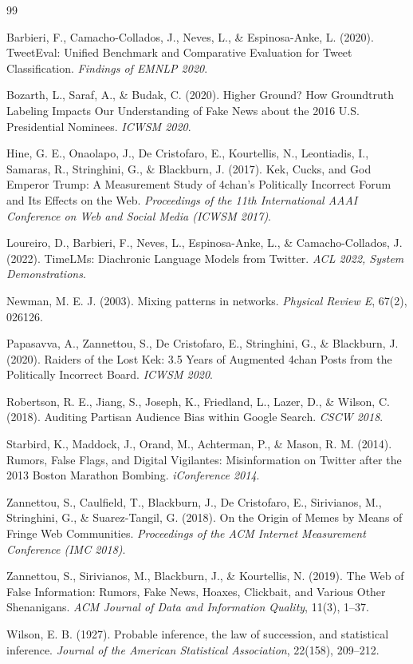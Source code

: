 \documentclass[11pt]{article}
\begin{document}
\begin{thebibliography}{99}

Barbieri, F., Camacho-Collados, J., Neves, L., \& Espinosa-Anke, L. (2020).
TweetEval: Unified Benchmark and Comparative Evaluation for Tweet
Classification. \emph{Findings of EMNLP 2020}.

Bozarth, L., Saraf, A., \& Budak, C. (2020). Higher Ground? How Groundtruth
Labeling Impacts Our Understanding of Fake News about the 2016 U.S.
Presidential Nominees. \emph{ICWSM 2020}.

Hine, G. E., Onaolapo, J., De Cristofaro, E., Kourtellis, N., Leontiadis, I.,
Samaras, R., Stringhini, G., \& Blackburn, J. (2017). Kek, Cucks, and God
Emperor Trump: A Measurement Study of 4chan's Politically Incorrect Forum and
Its Effects on the Web. \emph{Proceedings of the 11th International AAAI
Conference on Web and Social Media (ICWSM 2017)}.

Loureiro, D., Barbieri, F., Neves, L., Espinosa-Anke, L., \& Camacho-Collados,
J. (2022). TimeLMs: Diachronic Language Models from Twitter. \emph{ACL 2022,
System Demonstrations}.

Newman, M. E. J. (2003). Mixing patterns in networks. \emph{Physical Review E},
67(2), 026126.

Papasavva, A., Zannettou, S., De Cristofaro, E., Stringhini, G., \& Blackburn,
J. (2020). Raiders of the Lost Kek: 3.5 Years of Augmented 4chan Posts from the
Politically Incorrect Board. \emph{ICWSM 2020}.

Robertson, R. E., Jiang, S., Joseph, K., Friedland, L., Lazer, D., \& Wilson, C.
(2018). Auditing Partisan Audience Bias within Google Search. \emph{CSCW 2018}.

Starbird, K., Maddock, J., Orand, M., Achterman, P., \& Mason, R. M. (2014).
Rumors, False Flags, and Digital Vigilantes: Misinformation on Twitter after the
2013 Boston Marathon Bombing. \emph{iConference 2014}.

Zannettou, S., Caulfield, T., Blackburn, J., De Cristofaro, E., Sirivianos, M.,
Stringhini, G., \& Suarez-Tangil, G. (2018). On the Origin of Memes by Means of
Fringe Web Communities. \emph{Proceedings of the ACM Internet Measurement
Conference (IMC 2018)}.

Zannettou, S., Sirivianos, M., Blackburn, J., \& Kourtellis, N. (2019). The Web
of False Information: Rumors, Fake News, Hoaxes, Clickbait, and Various Other
Shenanigans. \emph{ACM Journal of Data and Information Quality}, 11(3), 1--37.

Wilson, E. B. (1927). Probable inference, the law of succession, and statistical
inference. \emph{Journal of the American Statistical Association}, 22(158),
209--212.

\end{thebibliography}
\end{document}
